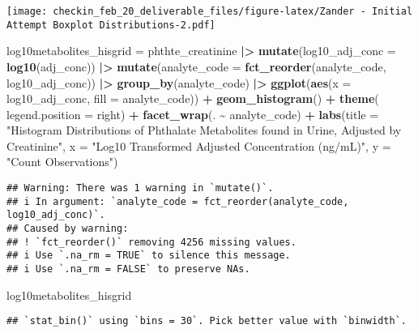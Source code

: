 \documentclass[
]{article}
\newenvironment{Shaded}{\begin{snugshade}}{\end{snugshade}}
\newcommand{\AttributeTok}[1]{\textcolor[rgb]{0.13,0.29,0.53}{#1}}
\newcommand{\FunctionTok}[1]{\textcolor[rgb]{0.13,0.29,0.53}{\textbf{#1}}}
\newcommand{\NormalTok}[1]{#1}
\newcommand{\OtherTok}[1]{\textcolor[rgb]{0.56,0.35,0.01}{#1}}
\newcommand{\SpecialCharTok}[1]{\textcolor[rgb]{0.81,0.36,0.00}{\textbf{#1}}}
\newcommand{\StringTok}[1]{\textcolor[rgb]{0.31,0.60,0.02}{#1}}
\begin{document}
\texttt{[image: checkin\_feb\_20\_deliverable\_files/figure-latex/Zander - Initial Attempt Boxplot Distributions-2.pdf]}

\begin{Shaded}
\begin{Highlighting}[]
\NormalTok{log10metabolites\_hisgrid }\OtherTok{=}\NormalTok{ phthte\_creatinine }\SpecialCharTok{|\textgreater{}} 
  \FunctionTok{mutate}\NormalTok{(}\AttributeTok{log10\_adj\_conc =} \FunctionTok{log10}\NormalTok{(adj\_conc)) }\SpecialCharTok{|\textgreater{}} 
  \FunctionTok{mutate}\NormalTok{(}\AttributeTok{analyte\_code =} \FunctionTok{fct\_reorder}\NormalTok{(analyte\_code, log10\_adj\_conc)) }\SpecialCharTok{|\textgreater{}} 
  \FunctionTok{group\_by}\NormalTok{(analyte\_code) }\SpecialCharTok{|\textgreater{}} 
  \FunctionTok{ggplot}\NormalTok{(}\FunctionTok{aes}\NormalTok{(}\AttributeTok{x =}\NormalTok{ log10\_adj\_conc, }\AttributeTok{fill =}\NormalTok{ analyte\_code)) }\SpecialCharTok{+} \FunctionTok{geom\_histogram}\NormalTok{() }\SpecialCharTok{+} \FunctionTok{theme}\NormalTok{(}
    \AttributeTok{legend.position =} \StringTok{\textquotesingle{}right\textquotesingle{}}\NormalTok{) }\SpecialCharTok{+} 
  \FunctionTok{facet\_wrap}\NormalTok{(. }\SpecialCharTok{\textasciitilde{}}\NormalTok{ analyte\_code) }\SpecialCharTok{+}
  \FunctionTok{labs}\NormalTok{(}\AttributeTok{title =} \StringTok{"Histogram Distributions of Phthalate Metabolites found in Urine, Adjusted by Creatinine"}\NormalTok{,}
    \AttributeTok{x =} \StringTok{"Log10 Transformed Adjusted Concentration (ng/mL)"}\NormalTok{,}
    \AttributeTok{y =}  \StringTok{"Count Observations"}\NormalTok{)}
\end{Highlighting}
\end{Shaded}

\begin{verbatim}
## Warning: There was 1 warning in `mutate()`.
## i In argument: `analyte_code = fct_reorder(analyte_code, log10_adj_conc)`.
## Caused by warning:
## ! `fct_reorder()` removing 4256 missing values.
## i Use `.na_rm = TRUE` to silence this message.
## i Use `.na_rm = FALSE` to preserve NAs.
\end{verbatim}

\begin{Shaded}
\begin{Highlighting}[]
\NormalTok{log10metabolites\_hisgrid }
\end{Highlighting}
\end{Shaded}

\begin{verbatim}
## `stat_bin()` using `bins = 30`. Pick better value with `binwidth`.
\end{verbatim}
\end{document}
